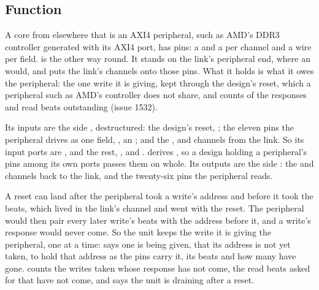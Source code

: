 
%
{}%
{}

\subsection*{Function}

A core from elsewhere that is an AXI4 peripheral, such as AMD's DDR3
controller generated with its AXI4 port, has pins: a  and a
 per channel and a wire per field.  is
 the other way round. It stands on the link's peripheral
end, where an  would, and puts the link's channels onto
those pins. What it holds is what it owes the peripheral: the one write
it is giving, kept through the design's reset, which a peripheral such
as AMD's controller does not share, and counts of the responses and
read beats outstanding (issue 1532).

Its inputs are the side , destructured: the design's
reset, ; the eleven pins the peripheral drives as one field,
, an ; and the ,  and
 channels from the link. So its input ports are ,
 and the rest, ,  and .
 derives , so a design holding a
peripheral's pins among its own ports passes them on whole. Its outputs
are the side : the  and 
channels back to the link, and the twenty-six pins the peripheral reads.

A reset can land after the peripheral took a write's address and
before it took the beats, which lived in the link's channel and went
with the reset. The peripheral would then pair every later write's
beats with the address before it, and a write's response would never
come. So the unit keeps the write it is giving the peripheral, one at
a time:  says one is being given,  that its
address is not yet taken,  to  hold that
address as the pins carry it,  its beats and 
how many have gone.  counts the writes taken whose response
has not come,  the read beats asked for that have not come,
and  says the unit is draining after a reset.

